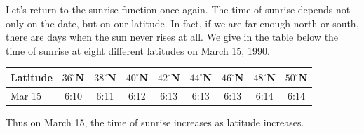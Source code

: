 	Let's return to the sunrise function once again.  The time of sunrise depends not only on the date, but on our latitude.  In fact, if we are far enough north or south, there are days when the sun never rises at all.  We give in the table below the time of sunrise at eight different latitudes on March 15, 1990.
\begin{center}


\begin{tabular}{lcccccccc}
Latitude&$36^\circ$N&$38^\circ$N&$40^\circ$N&$42^\circ$N&
$44^\circ$N&$46^\circ$N&$48^\circ$N&$50^\circ$N \\ \hline
Mar 15 & 	6:10 &	6:11 &	6:12 &	6:13 &	6:13 & 
6:13 &	6:14 &	6:14 
\end{tabular}

\end{center}
Thus on March 15, the time of sunrise increases as latitude increases.  

